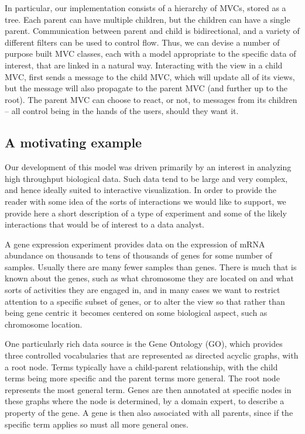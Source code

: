 \documentclass{article}[11pt]
\begin{document}
In particular, our implementation consists of a hierarchy of MVCs,
stored as a tree. Each parent can have multiple children, but the
children can have a single parent. Communication between parent and
child is bidirectional, and a variety of different filters can be used
to control flow. Thus, we can devise a number of purpose built MVC
classes, each with a model appropriate to the specific data of
interest, that are linked in a natural way. Interacting with the view
in a child MVC, first sends a message to the child MVC, which will
update all of its views, but the message will also propagate to the
parent MVC (and further up to the root). The parent MVC can choose to
react, or not, to messages from its children -- all control being in
the hands of the users, should they want it.

\subsection*{A motivating example}
\label{sec:micro}

Our development of this model was driven primarily by an interest in
analyzing high throughput biological data. Such data tend to be large
and very complex, and hence ideally suited to interactive
visualization. In order to provide the reader with some idea of the
sorts of interactions we would like to support, we provide here a short
description of a type of experiment and some of the likely
interactions that would be of interest to a data analyst.

A gene expression experiment provides data on the expression of mRNA
abundance on thousands to tens of thousands of genes for some number
of samples. Usually there are many fewer samples than genes. There is
much that is known about the genes, such as what chromosome they are
located on and what sorts of activities they are engaged in, and in many
cases we want to restrict attention to a specific subset of genes, or
to alter the view so that rather than being gene centric it becomes
centered on some biological aspect, such as chromosome location.

One particularly rich data source is the Gene Ontology (GO), \cite{GO}
which provides three controlled vocabularies that are represented as
directed acyclic graphs, with a root node. Terms typically have a
child-parent relationship, with the child terms being more specific
and the parent terms more general. The root node represents the most
general term. Genes are then annotated at specific nodes in these
graphs where the node is determined, by a domain expert, to describe a
property of the gene. A gene is then also associated with all parents,
since if the specific term applies so must all more general ones.
\end{document}
